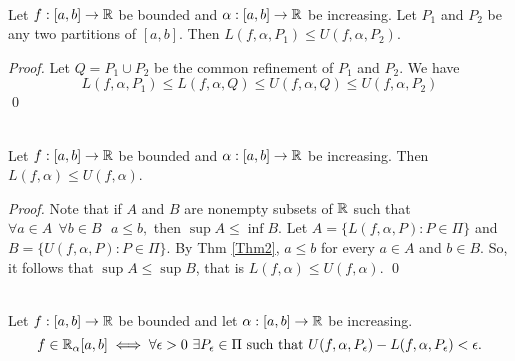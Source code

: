 \begin{theorem} \leavevmode \\
    \label{Thm2}
    Let $f: [a,b] \to \mathbb{R}$ be bounded and $\alpha : [a,b] \to \mathbb{R}$ be increasing. Let $P_1$ and $P_2$ be any two partitions of $[a,b].$ Then $L(f, \alpha, P_1) \leq U(f, \alpha, P_2)$.
\end{theorem}

\begin{proof}
    Let $Q = P_1 \cup P_2$ be the common refinement of $P_1$ and $P_2$. We have 
    $$
        L(f, \alpha, P_1) \leq L(f, \alpha, Q) \leq U(f, \alpha, Q) \leq U(f, \alpha, P_2)
    $$
    \qed
\end{proof}

\begin{theorem}  \leavevmode \\
    \label{Thm6.5}
    Let $f: [a,b] \to \mathbb{R}$ be bounded and $\alpha : [a,b] \to \mathbb{R}$ be increasing. Then $L(f, \alpha) \leq U(f, \alpha)$.
\end{theorem}

\begin{proof}
    Note that if $A$ and $B$ are nonempty subsets of $\mathbb{R}$ such that $\forall a \in A ~~\forall b \in B ~~~ a \leq b,$ then $\sup A \leq \inf B.$ Let $A= \{L(f, \alpha, P) : P \in \Pi\}$ and $B = \{U(f, \alpha, P) : P \in \Pi\}.$ By Thm \ref{Thm2}, $a \leq b$ for every $a \in A$ and $b \in B.$ So, it follows that $\sup A \leq \sup B$, that is $L(f, \alpha) \leq U(f, \alpha)$.
    \qed
\end{proof}

\begin{theorem}  \leavevmode \\
    \label{Thm6.6}
    Let $f: [a,b] \to \mathbb{R}$ be bounded and let $\alpha : [a,b] \to \mathbb{R}$ be increasing.
    $$
    f \in \mathbb{R}_\alpha [a,b] \iff \forall \epsilon > 0 ~\exists P_\epsilon \in \Pi \text{ such that } U(f, \alpha, P_\epsilon) - L(f, \alpha, P_\epsilon) < \epsilon.
    $$
\end{theorem}


